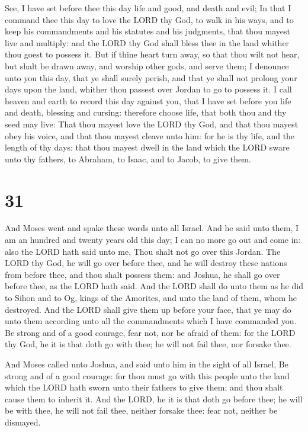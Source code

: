  See, I have set before thee this day life and good, and
death and evil;  In that I command thee this day to love
the LORD thy God, to walk in his ways, and to keep his commandments and
his statutes and his judgments, that thou mayest live and multiply: and
the LORD thy God shall bless thee in the land whither thou goest to
possess it.  But if thine heart turn away, so that thou
wilt not hear, but shalt be drawn away, and worship other gods, and
serve them;  I denounce unto you this day, that ye shall
surely perish, and that ye shall not prolong your days upon the land,
whither thou passest over Jordan to go to possess it.  I
call heaven and earth to record this day against you, that I have set
before you life and death, blessing and cursing: therefore choose life,
that both thou and thy seed may live:  That thou mayest
love the LORD thy God, and that thou mayest obey his voice, and that
thou mayest cleave unto him: for he is thy life, and the length of thy
days: that thou mayest dwell in the land which the LORD sware unto thy
fathers, to Abraham, to Isaac, and to Jacob, to give them.

\hypertarget{section-30}{%
\section{31}\label{section-30}}

 And Moses went and spake these words unto all Israel.
 And he said unto them, I am an hundred and twenty years
old this day; I can no more go out and come in: also the LORD hath said
unto me, Thou shalt not go over this Jordan.  The LORD thy
God, he will go over before thee, and he will destroy these nations from
before thee, and thou shalt possess them: and Joshua, he shall go over
before thee, as the LORD hath said.  And the LORD shall do
unto them as he did to Sihon and to Og, kings of the Amorites, and unto
the land of them, whom he destroyed.  And the LORD shall
give them up before your face, that ye may do unto them according unto
all the commandments which I have commanded you.  Be
strong and of a good courage, fear not, nor be afraid of them: for the
LORD thy God, he it is that doth go with thee; he will not fail thee,
nor forsake thee.

 And Moses called unto Joshua, and said unto him in the
sight of all Israel, Be strong and of a good courage: for thou must go
with this people unto the land which the LORD hath sworn unto their
fathers to give them; and thou shalt cause them to inherit it.
 And the LORD, he it is that doth go before thee; he will
be with thee, he will not fail thee, neither forsake thee: fear not,
neither be dismayed.

